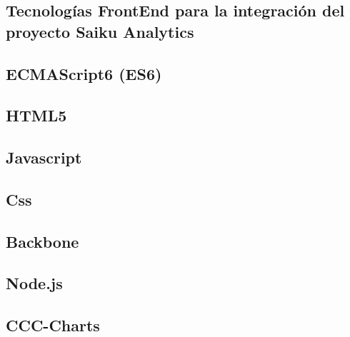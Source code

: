\begin{spacing}{1.5}
\section{Tecnolog\'{i}as FrontEnd para la integraci\'{o}n
		 del proyecto Saiku Analytics}
		\lipsum[1-2]
	\subsection{ECMAScript6 (ES6)}
			\lipsum[1-2]
	\subsection{HTML5}
			\lipsum[1-2]
	\subsection{Javascript}
			\lipsum[1-2]
	\subsection{Css}
			\lipsum[1-2]
	\subsection{Backbone}
			\lipsum[1-2]
	\subsection{Node.js}
			\lipsum[1-2]
	\subsection{CCC-Charts}
			\lipsum[1-2]
\end{spacing}
		
		
		
